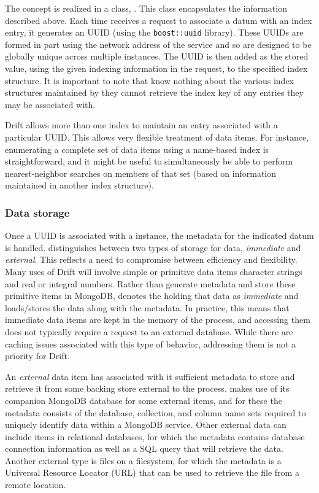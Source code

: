 The \dpart concept is realized in a class, \partclass.  This class encapsulates the information
described above.  Each time \driftd receives a request to associate a datum with an index entry, it
generates an UUID (using the \texttt{boost::uuid} library).  These UUIDs are formed in part using the
network address of the service and so are designed to be globally unique across multiple \driftd
instances.  The UUID is then added as the stored value, using the given indexing information in the
request, to the specified index structure.  It is important to note that \dparts know nothing about the
various index structures maintained by \driftd \textemdash they cannot retrieve the index key of any
entries they may be associated with.

Drift allows more than one index to maintain an entry associated with a particular UUID.  This allows
very flexible treatment of data items.  For instance, enumerating a complete set of data items using a
name-based index is straightforward, and it might be useful to simultaneously be able to perform
nearest-neighbor searches on members of that set (based on information maintained in another index
structure).  

\subsubsection{Data storage}

Once a UUID is associated with a \partclass instance, the metadata for the indicated datum is handled.
\driftd distinguishes between two types of storage for data, \emph{immediate} and \emph{external}.  This
reflects a need to compromise between efficiency and flexibility.  Many uses of Drift will involve simple
or primitive data items \textemdash character strings and real or integral numbers.  Rather than generate
metadata and store these primitive items in MongoDB, \driftd denotes the \dpart holding that data as
\emph{immediate} and loads/stores the data along with the \dpart metadata.  In practice, this means that
immediate data items are kept in the memory of the \driftd process, and accessing them does not typically
require a request to an external database.  While there are caching issues associated with this type of
behavior, addressing them is not a priority for Drift.  

An \emph{external} data item has associated with it sufficient metadata to store and retrieve it from
some backing store external to the \driftd process.  \driftd makes use of its companion MongoDB database
for some external items, and for these the metadata consists of the database, collection, and column name
sets required to uniquely identify data within a MongoDB service.  Other external data can include items
in relational databases, for which the metadata contains database connection information as well as a SQL
query that will retrieve the data.  Another external type is files on a filesystem, for which the
metadata is a Universal Resource Locator (URL) that can be used to retrieve the file from a remote
location.  

